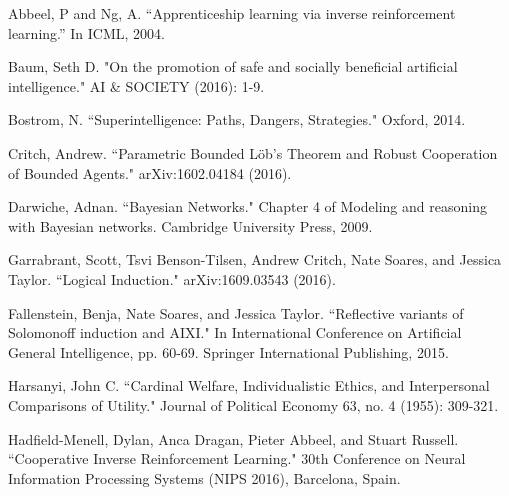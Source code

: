 \documentclass{article}  %
\begin{document}





\begin{thebibliography}{99}

 Abbeel, P and Ng, A.   ``Apprenticeship learning via inverse reinforcement learning.'' In ICML, 2004.


 Baum, Seth D. "On the promotion of safe and socially beneficial artificial intelligence." AI \& SOCIETY (2016): 1-9.

  Bostrom, N. ``Superintelligence: Paths, Dangers, Strategies." Oxford, 2014.

  Critch, Andrew. ``Parametric Bounded L\"{o}b's Theorem and Robust Cooperation of Bounded Agents." arXiv:1602.04184 (2016).

 Darwiche, Adnan. ``Bayesian Networks."  Chapter 4 of Modeling and reasoning with Bayesian networks. Cambridge University Press, 2009.

 Garrabrant, Scott, Tsvi Benson-Tilsen, Andrew Critch, Nate Soares, and Jessica Taylor. ``Logical Induction." arXiv:1609.03543 (2016).

 Fallenstein, Benja, Nate Soares, and Jessica Taylor. ``Reflective variants of Solomonoff induction and AIXI." In International Conference on Artificial General Intelligence, pp. 60-69. Springer International Publishing, 2015.

 Harsanyi, John C. ``Cardinal Welfare, Individualistic Ethics, and Interpersonal Comparisons of Utility." Journal of Political Economy 63, no. 4 (1955): 309-321.

 Hadfield-Menell, Dylan, Anca Dragan, Pieter Abbeel, and Stuart Russell. ``Cooperative Inverse Reinforcement Learning."  30th Conference on Neural Information Processing Systems (NIPS 2016), Barcelona, Spain.


\end{thebibliography}
\end{document}
